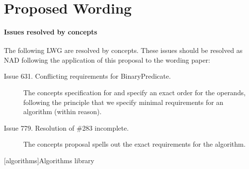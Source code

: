 \documentclass[american,twoside]{book}
\begin{document}
\section*{Proposed Wording}
\paragraph*{Issues resolved by concepts}
The following LWG are resolved by concepts. These issues should be
resolved as NAD following the application of this proposal to the
wording paper:
\begin{description}
\item[Issue 631. Conflicting requirements for BinaryPredicate.]  The
  concepts specification for  and
   specify an exact order for the operands,
  following the principle that we specify minimal requirements for an
  algorithm (within reason).
\item[Issue 779. Resolution of \#283 incomplete.]
The concepts proposal spells out the exact requirements for the
 algorithm.
\end{description}

\pagestyle{fancy}
\fancyhead[LE,RO]{\textbf{\rightmark}}
\fancyhead[RE]{\textbf{\leftmark\hspace{1em}\thepage}}
\fancyhead[LO]{\textbf{\thepage\hspace{1em}\leftmark}}


\renewcommand{\sectionmark}[1]{\markright{\thesection\hspace{1em}#1}}
\renewcommand{\chaptermark}[1]{\markboth{#1}{}}

\color{black}

\setcounter{chapter}{24}
[algorithms]{Algorithms library}
\end{document}
